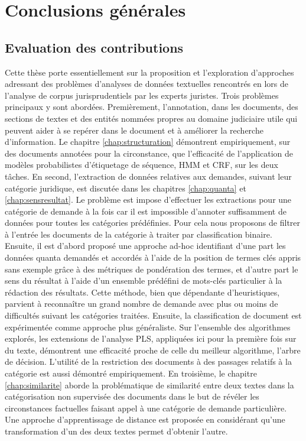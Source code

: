 \chapter*{Conclusions générales}
\label{chap:conclusion}

\section{Evaluation des contributions}
\label{sec:conclusion:contributions}
Cette thèse  porte essentiellement sur la proposition et l'exploration d'approches adressant des problèmes d'analyses de données textuelles rencontrés en lors de l'analyse de corpus jurisprudentiels par les experts juristes. Trois problèmes principaux y sont abordées. Premièrement, l'annotation, dans les documents, des sections de textes et des entités nommées propres au domaine judiciaire utile qui peuvent aider à se repérer dans le document et à améliorer la recherche d'information. Le chapitre \ref{chap:structuration}  démontrent empiriquement, sur des documents annotées pour la circonstance, que l'efficacité de l'application de modèles probabilistes d'étiquetage de séquence, HMM et CRF, sur les deux tâches. En second, l'extraction de données relatives aux demandes, suivant leur catégorie juridique, est discutée dans les chapitres \ref{chap:quanta} et \ref{chap:sensresultat}. Le problème est impose d'effectuer les extractions pour une catégorie de demande à la fois car il est impossible d'annoter suffisamment de données pour toutes les catégories prédéfinies. Pour cela nous proposons de filtrer à l'entrée les documents de la catégorie à traiter par classification binaire. Ensuite, il est d'abord proposé une approche ad-hoc identifiant d'une part les données quanta demandés et accordés à l'aide de la position de termes clés appris sans exemple grâce à des métriques de pondération des termes, et d'autre part le sens du résultat à l'aide d'un ensemble prédéfini de mots-clés particulier à la rédaction des résultats. Cette méthode, bien que dépendante d'heuristiques, parvient à reconnaître un grand nombre de demande avec plus ou moins de difficultés suivant les catégories traitées. Ensuite, la classification de document est expérimentée comme approche plus généraliste. Sur l'ensemble des algorithmes explorés, les extensions de l'analyse PLS, appliquées ici pour la première fois sur du texte, démontrent une efficacité proche de celle du meilleur algorithme, l'arbre de décision.  L'utilité de la restriction des documents à des passages relatifs à la catégorie est aussi démontré empiriquement. En troisième, le chapitre \ref{chap:similarite} aborde la problématique de similarité entre deux textes dans la catégorisation non supervisée des documents dans le but de révéler les circonstances factuelles faisant appel à une catégorie de demande particulière. Une approche d'apprentissage de distance est proposée en considérant qu'une transformation d'un des deux textes permet d'obtenir l'autre.
